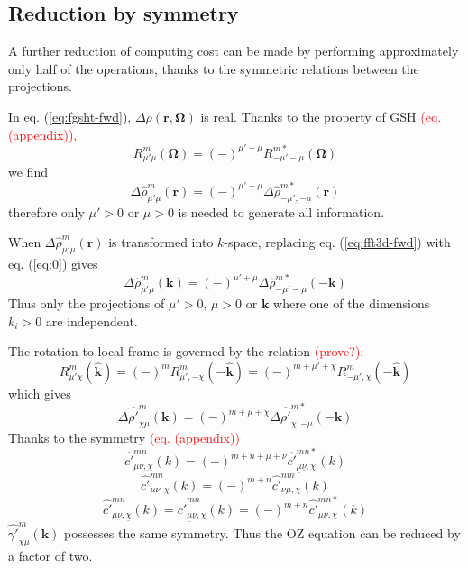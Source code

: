 \subsection{Reduction by symmetry\label{sub:Reduction-by-symmetry}}

A further reduction of computing cost can be made by performing approximately
only half of the operations, thanks to the symmetric relations between
the projections.

In eq. (\ref{eq:fgsht-fwd}), $\Delta\rho(\mathbf{r},\mathbf{\Omega})$
is real. Thanks to the property of GSH \textcolor{red}{(eq. (appendix)),}
\[
R_{\mu'\mu}^{m}(\mathbf{\Omega})=(-)^{\mu'+\mu}R_{-\mu'-\mu}^{m*}(\mathbf{\Omega})
\]
we find
\begin{equation}
\Delta\hat{\rho}_{\mu'\mu}^{m}(\mathbf{r})=(-)^{\mu'+\mu}\Delta\hat{\rho}_{-\mu',-\mu}^{m*}(\mathbf{r})\label{eq:0}
\end{equation}
therefore only $\mu'>0$ or $\mu>0$ is needed to generate all information.

When $\Delta\hat{\rho}_{\mu'\mu}^{m}(\mathbf{r})$ is transformed
into $k$-space, replacing eq. (\ref{eq:fft3d-fwd}) with eq. (\ref{eq:0})
gives
\begin{equation}
\Delta\hat{\rho}_{\mu'\mu}^{m}(\mathbf{k})=(-)^{\mu'+\mu}\Delta\hat{\rho}_{-\mu'-\mu}^{m*}(-\mathbf{k})\label{eq:1}
\end{equation}
Thus only the projections of $\mu'>0$, $\mu>0$ or $\mathbf{k}$
where one of the dimensions $k_{i}>0$ are independent.

The rotation to local frame is governed by the relation \textcolor{red}{(prove?):}
\begin{equation}
R_{\mu'\chi}^{m}(\hat{\mathbf{k}})=(-)^{m}R_{\mu',-\chi}^{m}(-\hat{\mathbf{k}})=(-)^{m+\mu'+\chi}R_{-\mu',\chi}^{m}(-\hat{\mathbf{k}})\label{eq:3}
\end{equation}
which gives
\begin{equation}
\Delta\hat{\rho'}_{\chi\mu}^{m}(\mathbf{k})=(-)^{m+\mu+\chi}\Delta\hat{\rho'}_{\chi,-\mu}^{m*}(-\mathbf{k})\label{eq:2}
\end{equation}
Thanks to the symmetry\textcolor{red}{{} (eq. (appendix))} 
\begin{equation}
\hat{c'}_{\mu\nu,\chi}^{mn}(k)=(-)^{m+n+\mu+\nu}\hat{c'}_{\underline{\mu}\underline{\nu},\chi}^{mn*}(k)
\end{equation}
\begin{equation}
\hat{c'}_{\mu\nu,\chi}^{mn}(k)=(-)^{m+n}\hat{c'}_{\nu\mu,\chi}^{nm}(k)
\end{equation}
\begin{equation}
\hat{c'}_{\mu\nu,\underline{\chi}}^{mn}(k)=\hat{c'}_{\underline{\mu}\underline{\nu},\chi}^{mn}(k)=(-)^{m+n}\hat{c'}_{\mu\nu,\chi}^{mn*}(k)
\end{equation}
$\hat{\gamma'}_{\chi\mu}^{m}(\mathbf{k})$ possesses the same symmetry.
Thus the OZ equation can be reduced by a factor of two.

